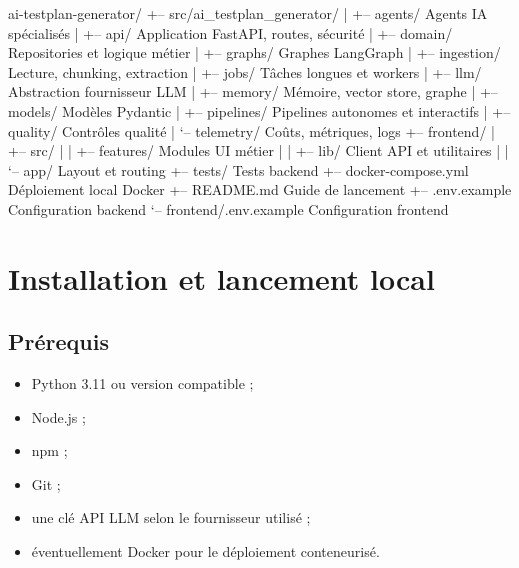 \documentclass[
  french,
]{report}
\newenvironment{Shaded}{}{}
\newcommand{\NormalTok}[1]{#1}
\providecommand{\tightlist}{%
  \setlength{\itemsep}{0pt}\setlength{\parskip}{0pt}}
\begin{document}
\begin{Shaded}
\begin{Highlighting}[]
\NormalTok{ai{-}testplan{-}generator/}
\NormalTok{+-- src/ai\_testplan\_generator/}
\NormalTok{|   +-- agents/          Agents IA spécialisés}
\NormalTok{|   +-- api/             Application FastAPI, routes, sécurité}
\NormalTok{|   +-- domain/          Repositories et logique métier}
\NormalTok{|   +-- graphs/          Graphes LangGraph}
\NormalTok{|   +-- ingestion/       Lecture, chunking, extraction}
\NormalTok{|   +-- jobs/            Tâches longues et workers}
\NormalTok{|   +-- llm/             Abstraction fournisseur LLM}
\NormalTok{|   +-- memory/          Mémoire, vector store, graphe}
\NormalTok{|   +-- models/          Modèles Pydantic}
\NormalTok{|   +-- pipelines/       Pipelines autonomes et interactifs}
\NormalTok{|   +-- quality/         Contrôles qualité}
\NormalTok{|   `-- telemetry/       Coûts, métriques, logs}
\NormalTok{+-- frontend/}
\NormalTok{|   +-- src/}
\NormalTok{|   |   +-- features/    Modules UI métier}
\NormalTok{|   |   +-- lib/         Client API et utilitaires}
\NormalTok{|   |   `-- app/         Layout et routing}
\NormalTok{+-- tests/               Tests backend}
\NormalTok{+-- docker{-}compose.yml   Déploiement local Docker}
\NormalTok{+-- README.md            Guide de lancement}
\NormalTok{+-- .env.example         Configuration backend}
\NormalTok{`-- frontend/.env.example Configuration frontend}
\end{Highlighting}
\end{Shaded}

\chapter{Installation et lancement
local}\label{installation-et-lancement-local}

\section{Prérequis}\label{pruxe9requis}

\begin{itemize}
\tightlist
\item
  Python 3.11 ou version compatible ;
\item
  Node.js ;
\item
  npm ;
\item
  Git ;
\item
  une clé API LLM selon le fournisseur utilisé ;
\item
  éventuellement Docker pour le déploiement conteneurisé.
\end{itemize}
\end{document}
